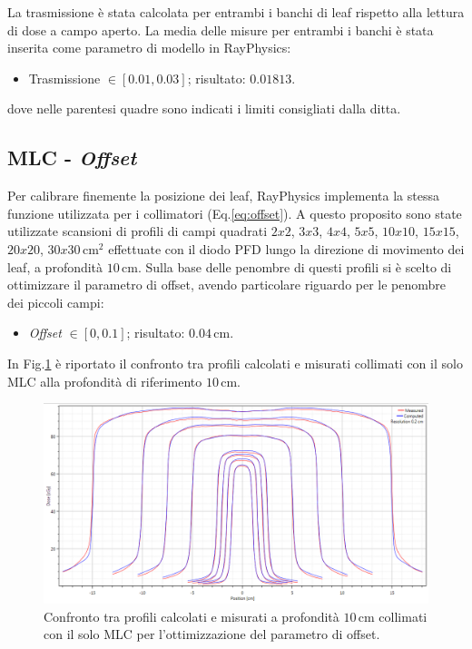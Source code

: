 La trasmissione è stata calcolata per entrambi i banchi di leaf rispetto alla lettura di dose a campo aperto. La media delle misure per entrambi i banchi è stata inserita come parametro di modello in RayPhysics:
\begin{itemize}
\item Trasmissione $\in [0.01,0.03]$; risultato: $0.01813$.
\end{itemize}
dove nelle parentesi quadre sono indicati i limiti consigliati dalla ditta.


\subsection{MLC - \textit{Offset}}
Per calibrare finemente la posizione dei leaf, RayPhysics implementa la stessa funzione utilizzata per i collimatori (Eq.\ref{eq:offset}). A questo proposito sono state utilizzate scansioni di profili di campi quadrati $2x2$, $3x3$, $4x4$, $5x5$, $10x10$, $15x15$, $20x20$, $30x30\,$cm$^2$ effettuate con il diodo PFD lungo la direzione di movimento dei leaf, a profondità $10\,$cm. Sulla base delle penombre di questi profili si è scelto di ottimizzare il parametro di offset, avendo particolare riguardo per le penombre dei piccoli campi:
\begin{itemize}
\item \textit{Offset} $\in [0,0.1]$; risultato: $0.04\,$cm.
\end{itemize}
In Fig.\ref{fig:MLC_Offset} è riportato il confronto tra profili calcolati e misurati collimati con il solo MLC alla profondità di riferimento $10\,$cm.
\begin{figure}
\centering
\includegraphics[width=\textwidth]{./cap2/MLC_Offset.png}
\caption{Confronto tra profili calcolati e misurati a profondità $10\,$cm collimati con il solo MLC per l'ottimizzazione del parametro di offset.}
\label{fig:MLC_Offset}
\end{figure}

